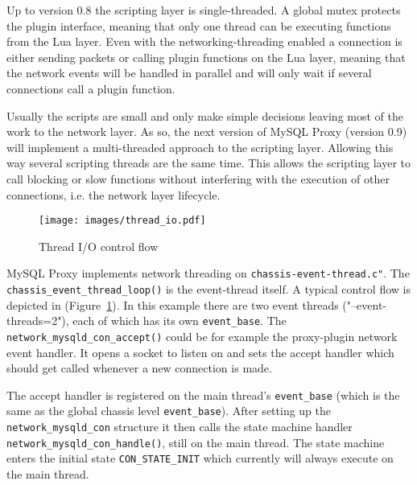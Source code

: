 Up to version 0.8 the scripting layer is single-threaded. A global mutex protects the plugin interface, meaning that only one thread can be executing functions from the Lua layer. Even with the networking-threading enabled a connection is either sending packets or calling plugin functions on the Lua layer, meaning that the network events will be handled in parallel and will only wait if several connections call a plugin function.

Usually the scripts are small and only make simple decisions leaving most of the work to the network layer.
As so, the next version of MySQL Proxy (version 0.9) will implement a multi-threaded approach to the scripting layer. Allowing this way several scripting threads are the same time. This allows the scripting layer to call blocking or slow functions without interfering with the execution of other connections, i.e. the network layer lifecycle.



\begin{figure}[t]
\centering    
\texttt{[image: images/thread\_io.pdf]}
\caption{Thread I/O control flow}
\label{fig:thread_io}
\end{figure}

MySQL Proxy implements network threading on \texttt{chassis-event-thread.c"}.
The \texttt{chassis\_event\_thread\_loop()} is the event-thread itself. A typical control flow is depicted in (Figure~\ref{fig:thread_io}). In this example there are two event threads ("--event-threads=2"), each of which has its own \texttt{event\_base}. The \texttt{network\_mysqld\_con\_accept()} could be for example the proxy-plugin network event handler. It opens a socket to listen on and sets the accept handler which should get called whenever a new connection is made.

The accept handler is registered on the main thread's \texttt{event\_base} (which is the same as the global chassis level \texttt{event\_base}).
After setting up the \texttt{network\_mysqld\_con} structure it then calls the state machine handler \texttt{network\_mysqld\_con\_handle()}, still on the main thread.
The state machine enters the initial state \texttt{CON\_STATE\_INIT} which currently will always execute on the main thread.

